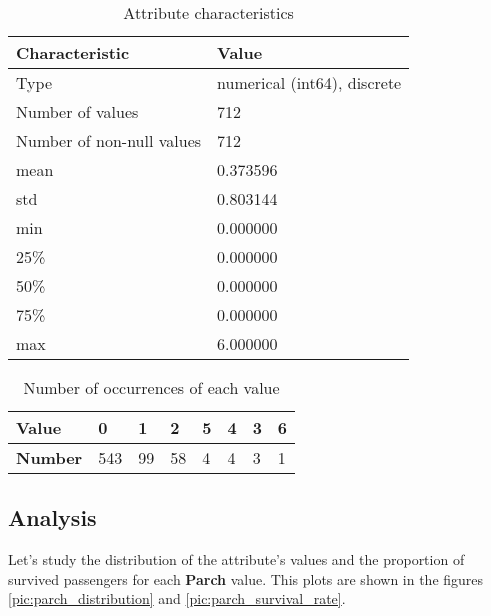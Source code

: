 \begin{table}[!hp]
    \centering
    \caption{Attribute characteristics}
    \begin{tabular}{|l|l|}
        \hline
        \textbf{Characteristic}   & \textbf{Value}              \\ \hline
        Type                      & numerical (int64), discrete \\ \hline
        Number of values          & 712                         \\ \hline
        Number of non-null values & 712                         \\ \hline
        mean                      & 0.373596                    \\ \hline
        std                       & 0.803144                    \\ \hline
        min                       & 0.000000                    \\ \hline
        25\%                      & 0.000000                    \\ \hline
        50\%                      & 0.000000                    \\ \hline
        75\%                      & 0.000000                    \\ \hline
        max                       & 6.000000                    \\ \hline
    \end{tabular}
    \label{table:parch_characteristics}
\end{table}

\begin{table}[!hp]
    \centering
    \caption{Number of occurrences of each value}
    \begin{tabular}{|l|l|l|l|l|l|l|l|}
        \hline
        \textbf{Value}  & 0   & 1  & 2  & 5 & 4 & 3 & 6 \\ \hline
        \textbf{Number} & 543 & 99 & 58 & 4 & 4 & 3 & 1 \\ \hline
    \end{tabular}
    \label{table:parch_value_counts}
\end{table}

\subsection{Analysis}
Let's study the distribution of the attribute's values and the proportion 
of survived passengers for each \textbf{Parch} value. This plots are shown
in the figures \ref{pic:parch_distribution} and \ref{pic:parch_survival_rate}.

